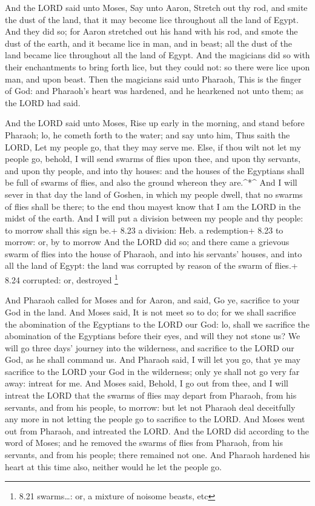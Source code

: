  And the LORD said unto Moses, Say unto Aaron, Stretch out
thy rod, and smite the dust of the land, that it may become lice
throughout all the land of Egypt.  And they did so; for
Aaron stretched out his hand with his rod, and smote the dust of the
earth, and it became lice in man, and in beast; all the dust of the land
became lice throughout all the land of Egypt.  And the
magicians did so with their enchantments to bring forth lice, but they
could not: so there were lice upon man, and upon beast. 
Then the magicians said unto Pharaoh, This is the finger of God: and
Pharaoh's heart was hardened, and he hearkened not unto them; as the
LORD had said.

 And the LORD said unto Moses, Rise up early in the
morning, and stand before Pharaoh; lo, he cometh forth to the water; and
say unto him, Thus saith the LORD, Let my people go, that they may serve
me.  Else, if thou wilt not let my people go, behold, I
will send swarms of flies upon thee, and upon thy servants, and upon thy
people, and into thy houses: and the houses of the Egyptians shall be
full of swarms of flies, and also the ground whereon they are.\^{}*\^{}
 And I will sever in that day the land of Goshen, in which
my people dwell, that no swarms of flies shall be there; to the end thou
mayest know that I am the LORD in the midst of the earth. 
And I will put a division between my people and thy people: to morrow
shall this sign be.+ 8.23 a division: Heb. a redemption+ 8.23 to morrow:
or, by to morrow  And the LORD did so; and there came a
grievous swarm of flies into the house of Pharaoh, and into his
servants' houses, and into all the land of Egypt: the land was corrupted
by reason of the swarm of flies.+ 8.24 corrupted: or, destroyed
\footnote{8.21 swarms\ldots: or, a mixture of noisome beasts, etc}

 And Pharaoh called for Moses and for Aaron, and said, Go
ye, sacrifice to your God in the land.  And Moses said, It
is not meet so to do; for we shall sacrifice the abomination of the
Egyptians to the LORD our God: lo, shall we sacrifice the abomination of
the Egyptians before their eyes, and will they not stone us?
 We will go three days' journey into the wilderness, and
sacrifice to the LORD our God, as he shall command us.  And
Pharaoh said, I will let you go, that ye may sacrifice to the LORD your
God in the wilderness; only ye shall not go very far away: intreat for
me.  And Moses said, Behold, I go out from thee, and I will
intreat the LORD that the swarms of flies may depart from Pharaoh, from
his servants, and from his people, to morrow: but let not Pharaoh deal
deceitfully any more in not letting the people go to sacrifice to the
LORD.  And Moses went out from Pharaoh, and intreated the
LORD.  And the LORD did according to the word of Moses; and
he removed the swarms of flies from Pharaoh, from his servants, and from
his people; there remained not one.  And Pharaoh hardened
his heart at this time also, neither would he let the people go.

